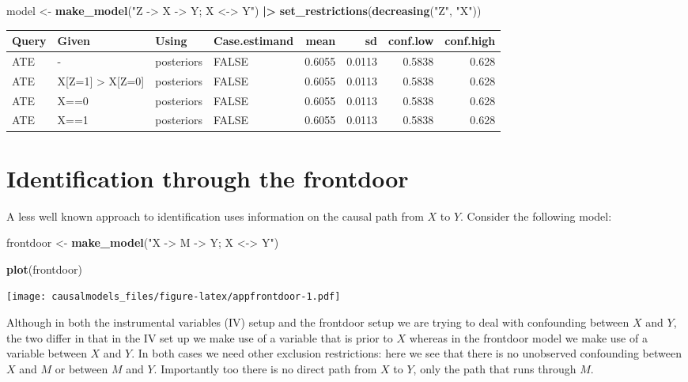 \documentclass[
  12pt,
]{book}
\newenvironment{Shaded}{\begin{snugshade}}{\end{snugshade}}
\newcommand{\FunctionTok}[1]{\textcolor[rgb]{0.13,0.29,0.53}{\textbf{#1}}}
\newcommand{\NormalTok}[1]{#1}
\newcommand{\OtherTok}[1]{\textcolor[rgb]{0.56,0.35,0.01}{#1}}
\newcommand{\SpecialCharTok}[1]{\textcolor[rgb]{0.81,0.36,0.00}{\textbf{#1}}}
\newcommand{\StringTok}[1]{\textcolor[rgb]{0.31,0.60,0.02}{#1}}
\begin{document}
\begin{Shaded}
\begin{Highlighting}[]
\NormalTok{model }\OtherTok{\textless{}{-}} \FunctionTok{make\_model}\NormalTok{(}\StringTok{"Z {-}\textgreater{} X {-}\textgreater{} Y; X \textless{}{-}\textgreater{} Y"}\NormalTok{)  }\SpecialCharTok{|\textgreater{}}
         \FunctionTok{set\_restrictions}\NormalTok{(}\FunctionTok{decreasing}\NormalTok{(}\StringTok{"Z"}\NormalTok{, }\StringTok{"X"}\NormalTok{)) }
\end{Highlighting}
\end{Shaded}

\begin{tabular}{l|l|l|l|r|r|r|r}
\hline
Query & Given & Using & Case.estimand & mean & sd & conf.low & conf.high\\
\hline
ATE & - & posteriors & FALSE & 0.6055 & 0.0113 & 0.5838 & 0.628\\
\hline
ATE & X[Z=1] > X[Z=0] & posteriors & FALSE & 0.6055 & 0.0113 & 0.5838 & 0.628\\
\hline
ATE & X==0 & posteriors & FALSE & 0.6055 & 0.0113 & 0.5838 & 0.628\\
\hline
ATE & X==1 & posteriors & FALSE & 0.6055 & 0.0113 & 0.5838 & 0.628\\
\hline
\end{tabular}

\hypertarget{identification-through-the-frontdoor}{%
\section{Identification through the frontdoor}\label{identification-through-the-frontdoor}}

A less well known approach to identification uses information on the causal path from \(X\) to \(Y\). Consider the following model:

\begin{Shaded}
\begin{Highlighting}[]
\NormalTok{frontdoor }\OtherTok{\textless{}{-}} \FunctionTok{make\_model}\NormalTok{(}\StringTok{"X {-}\textgreater{} M {-}\textgreater{} Y; X \textless{}{-}\textgreater{} Y"}\NormalTok{) }

\FunctionTok{plot}\NormalTok{(frontdoor)}
\end{Highlighting}
\end{Shaded}

\texttt{[image: causalmodels\_files/figure-latex/appfrontdoor-1.pdf]}

Although in both the instrumental variables (IV) setup and the frontdoor setup we are trying to deal with confounding between \(X\) and \(Y\), the two differ in that in the IV set up we make use of a variable that is prior to \(X\) whereas in the frontdoor model we make use of a variable between \(X\) and \(Y\). In both cases we need other exclusion restrictions: here we see that there is no unobserved confounding between \(X\) and \(M\) or between \(M\) and \(Y\). Importantly too there is no direct path from \(X\) to \(Y\), only the path that runs through \(M\).
\end{document}
